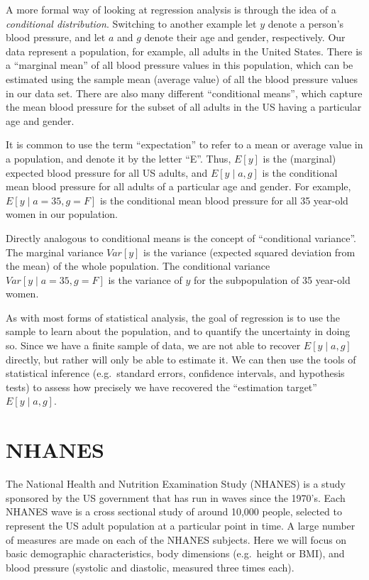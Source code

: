 \documentclass[11pt]{article}
\begin{document}
    A more formal way of looking at regression analysis is through the idea
of a \emph{conditional distribution}. Switching to another example let
\(y\) denote a person's blood pressure, and let \(a\) and \(g\) denote
their age and gender, respectively. Our data represent a population, for
example, all adults in the United States. There is a ``marginal mean''
of all blood pressure values in this population, which can be estimated
using the sample mean (average value) of all the blood pressure values
in our data set. There are also many different ``conditional means'',
which capture the mean blood pressure for the subset of all adults in
the US having a particular age and gender.

It is common to use the term ``expectation'' to refer to a mean or
average value in a population, and denote it by the letter ``E''. Thus,
\(E[y]\) is the (marginal) expected blood pressure for all US adults,
and \(E[y \;|\; a, g]\) is the conditional mean blood pressure for all
adults of a particular age and gender. For example,
\(E[y \;|\; a=35, g=F]\) is the conditional mean blood pressure for all
35 year-old women in our population.

    Directly analogous to conditional means is the concept of ``conditional
variance''. The marginal variance \(Var[y]\) is the variance (expected
squared deviation from the mean) of the whole population. The
conditional variance \(Var[y \;|\; a=35, g=F]\) is the variance of \(y\)
for the subpopulation of 35 year-old women.

    As with most forms of statistical analysis, the goal of regression is to
use the sample to learn about the population, and to quantify the
uncertainty in doing so. Since we have a finite sample of data, we are
not able to recover \(E[y \;|\; a,g]\) directly, but rather will only be
able to estimate it. We can then use the tools of statistical inference
(e.g.~standard errors, confidence intervals, and hypothesis tests) to
assess how precisely we have recovered the ``estimation target''
\(E[y \;|\; a, g]\).

    \hypertarget{nhanes}{%
\section{NHANES}\label{nhanes}}

    The National Health and Nutrition Examination Study (NHANES) is a study
sponsored by the US government that has run in waves since the 1970's.
Each NHANES wave is a cross sectional study of around 10,000 people,
selected to represent the US adult population at a particular point in
time. A large number of measures are made on each of the NHANES
subjects. Here we will focus on basic demographic characteristics, body
dimensions (e.g.~height or BMI), and blood pressure (systolic and
diastolic, measured three times each).
\end{document}
